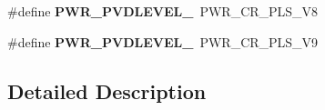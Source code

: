 \begin{DoxyCompactItemize}
\item 
\mbox{\label{group___p_w_r___p_v_d__detection__level_ga5dda7d0ac3fd3d606666455ca3c8f537}} 
\#define {\bfseries P\+W\+R\+\_\+\+P\+V\+D\+L\+E\+V\+E\+L\+\_}~P\+W\+R\+\_\+\+C\+R\+\_\+\+P\+L\+S\+\_\+V8
\item 
\mbox{\label{group___p_w_r___p_v_d__detection__level_ga2c5cd8dd26b13bdf0164c1f7596b4bfd}} 
\#define {\bfseries P\+W\+R\+\_\+\+P\+V\+D\+L\+E\+V\+E\+L\+\_}~P\+W\+R\+\_\+\+C\+R\+\_\+\+P\+L\+S\+\_\+V9
\end{DoxyCompactItemize}


\subsection{Detailed Description}
